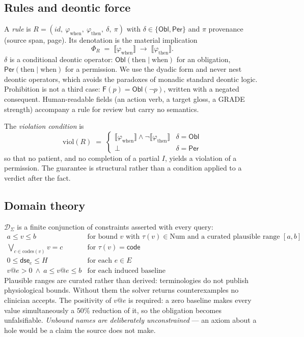 \subsection{Rules and deontic force}

A \emph{rule} is $R = (\mathit{id},\ \varphi_{\mathrm{when}},\
\varphi_{\mathrm{then}},\ \delta,\ \pi)$ with
$\delta \in \{\mathsf{Obl},\mathsf{Per}\}$ and $\pi$ provenance (source span, page).
Its denotation is the material implication
\[
  \Phi_R \;=\; \llbracket \varphi_{\mathrm{when}} \rrbracket
               \;\rightarrow\; \llbracket \varphi_{\mathrm{then}} \rrbracket .
\]
$\delta$ is a conditional deontic operator: $\mathsf{Obl}(\mathrm{then}\mid
\mathrm{when})$ for an obligation, $\mathsf{Per}(\mathrm{then}\mid\mathrm{when})$
for a permission. We use the dyadic form and never nest deontic operators, which
avoids the paradoxes of monadic standard deontic logic. Prohibition is not a
third case: $\mathsf{F}(p) = \mathsf{Obl}(\neg p)$, written with a negated
consequent. Human-readable fields (an action verb, a target gloss, a GRADE
strength) accompany a rule for review but carry no semantics.

The \emph{violation condition} is
\[
  \mathrm{viol}(R) \;=\;
  \begin{cases}
    \llbracket \varphi_{\mathrm{when}} \rrbracket \wedge
      \neg \llbracket \varphi_{\mathrm{then}} \rrbracket
      & \delta = \mathsf{Obl} \\
    \bot & \delta = \mathsf{Per}
  \end{cases}
\]
so that no patient, and no completion of a partial $I$, yields a violation of a
permission. The guarantee is structural rather than a condition applied to a
verdict after the fact.

\subsection{Domain theory}

$\mathcal{D}_\Sigma$ is a finite conjunction of constraints asserted with every
query:
\[
\begin{array}{ll}
  a \le v \le b & \text{for bound } v \text{ with } \tau(v)\in\mathrm{Num}
                  \text{ and a curated plausible range } [a,b] \\
  \bigvee_{c \in \mathrm{codes}(v)} v = c & \text{for } \tau(v)=\mathsf{code} \\
  0 \le \mathsf{dse}_e \le H & \text{for each } e \in E \\
  v@e > 0 \ \wedge\ a \le v@e \le b & \text{for each induced baseline}
\end{array}
\]
Plausible ranges are curated rather than derived: terminologies do not publish
physiological bounds. Without them the solver returns counterexamples no
clinician accepts. The positivity of $v@e$ is required: a zero baseline makes
every value simultaneously a $50\%$ reduction of it, so the obligation becomes
unfalsifiable. \emph{Unbound names are deliberately unconstrained} --- an axiom
about a hole would be a claim the source does not make.

